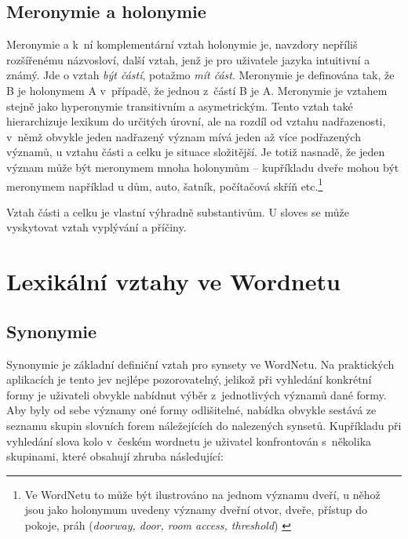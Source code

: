 \documentclass[a4paper, 11pt, oneside, showtrims]{book}
\newcommand\ex{\textsf}
\begin{document}
				\subsection{Meronymie a holonymie}

					Meronymie a k~ní komplementární vztah holonymie je, navzdory nepříliš rozšířenému názvosloví, další vztah, jenž je pro uživatele jazyka intuitivní a známý. Jde o vztah \textit{být částí}, potažmo \textit{mít část}. Meronymie je definována tak, že B je holonymem A v~případě, že jednou z~částí B je A. Meronymie je vztahem stejně jako hyperonymie transitivním a asymetrickým. \parencite{cruse1986lexical} Tento vztah také hierarchizuje lexikum do určitých úrovní, ale na rozdíl od vztahu nadřazenosti, v~němž obvykle jeden nadřazený význam mívá jeden až více podřazených významů, u vztahu části a celku je situace složitější. Je totiž nasnadě, že jeden význam může být meronymem mnoha holonymům -- kupříkladu \ex{dveře} mohou být meronymem například u \ex{dům}, \ex{auto}, \ex{šatník}, \ex{počítačová skříň} etc.\footnote{Ve WordNetu to může být ilustrováno na jednom významu \ex{dveří}, u něhož jsou jako holonymum uvedeny významy \ex{dveřní otvor, dveře, přístup do pokoje, práh} (\textit{doorway, door, room access, threshold}) \parencite{princetonWN}}

					Vztah části a celku je vlastní výhradně substantivům. U sloves se může vyskytovat vztah vyplývání a příčiny.



			\section{Lexikální vztahy ve Wordnetu}
			\label{cha:lexvztah}

				\subsection{Synonymie}
				\label{cha:synon}

					Synonymie je základní definiční vztah pro synsety ve WordNetu. Na praktických aplikacích je tento jev nejlépe pozorovatelný, jelikož při vyhledání konkrétní formy je uživateli obvykle nabídnut výběr z~jednotlivých významů dané formy. Aby byly od sebe významy oné formy odlišitelné, nabídka obvykle sestává ze seznamu skupin slovních forem náležejících do nalezených synsetů. Kupříkladu při vyhledání slova \ex{kolo} v~českém wordnetu je uživatel konfrontován s~několika skupinami, které obsahují zhruba následující:
\end{document}
